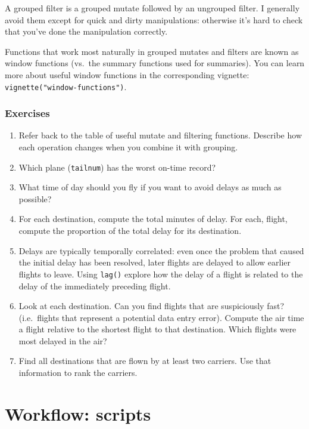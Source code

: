 \documentclass[]{book}
\begin{document}
A grouped filter is a grouped mutate followed by an ungrouped filter. I
generally avoid them except for quick and dirty manipulations: otherwise
it's hard to check that you've done the manipulation correctly.

Functions that work most naturally in grouped mutates and filters are
known as window functions (vs.~the summary functions used for
summaries). You can learn more about useful window functions in the
corresponding vignette: \texttt{vignette("window-functions")}.

\subsection{Exercises}\label{exercises-12}

\begin{enumerate}
\def\labelenumi{\arabic{enumi}.}
\item
  Refer back to the table of useful mutate and filtering functions.
  Describe how each operation changes when you combine it with grouping.
\item
  Which plane (\texttt{tailnum}) has the worst on-time record?
\item
  What time of day should you fly if you want to avoid delays as much as
  possible?
\item
  For each destination, compute the total minutes of delay. For each,
  flight, compute the proportion of the total delay for its destination.
\item
  Delays are typically temporally correlated: even once the problem that
  caused the initial delay has been resolved, later flights are delayed
  to allow earlier flights to leave. Using \texttt{lag()} explore how
  the delay of a flight is related to the delay of the immediately
  preceding flight.
\item
  Look at each destination. Can you find flights that are suspiciously
  fast? (i.e.~flights that represent a potential data entry error).
  Compute the air time a flight relative to the shortest flight to that
  destination. Which flights were most delayed in the air?
\item
  Find all destinations that are flown by at least two carriers. Use
  that information to rank the carriers.
\end{enumerate}

\hypertarget{workflow-scripts}{\chapter{Workflow:
scripts}\label{workflow-scripts}}
\end{document}
